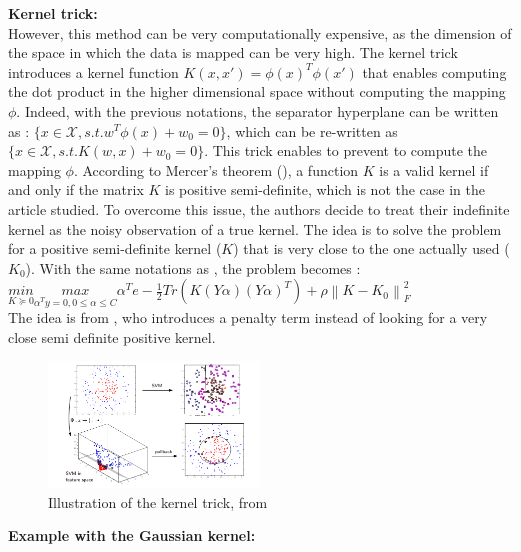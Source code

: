 \documentclass[a4paper,11pt]{article}
\begin{document}
\textbf{Kernel trick: } \\



However, this method can be very computationally expensive, as the dimension of the space in which the data is mapped can be very high.
The kernel trick introduces a kernel function $K(x, x') = \phi(x)^T \phi(x')$ that enables computing the dot product in the higher dimensional space without computing the mapping $\phi$.
Indeed, with the previous notations, the separator hyperplane can be written as : $\{ x \in \mathcal{X}, s.t. w^T \phi(x) + w_0 =0  \} $, which can be re-written as $\{ x \in \mathcal{X}, s.t.  K(w, x) + w_0 = 0 \}$. 
This trick enables to prevent to compute the mapping $\phi$. 
According to Mercer's theorem (\cite{mercer1909xvi}), a function $K$ is a valid kernel if and only if the matrix $K$ is positive semi-definite, which is not the case in the article studied. 
To overcome this issue, the authors decide to treat their indefinite kernel as the noisy observation of a true kernel. 
The idea is to solve the problem for a positive semi-definite kernel ($K$) that is very close to the one actually used ($K_0$).
With the same notations as \cite{lanckriet2004learning}, the problem becomes : \\

$  \underset{K \succeq 0 }{min } \underset{\alpha^T y = 0, 0 \leq \alpha \leq C}{max}  \alpha^T e - \frac{1}{2}  Tr(K(Y \alpha) (Y \alpha)^T) + \rho \left\lVert K - K_0\right\rVert _F ^2 $\\[0.3cm]
The idea is from \cite{luss2007support}, who introduces a penalty term instead of looking for a very close semi definite positive kernel.\\

\begin{figure}[h]
    \centering
    \includegraphics[width=0.5\textwidth]{figures/kernel_trick.png}
    \caption{Illustration of the kernel trick, from \cite{oudot2022cpp}}
\end{figure}

\textbf{Example with the Gaussian kernel: } \\
\end{document}
